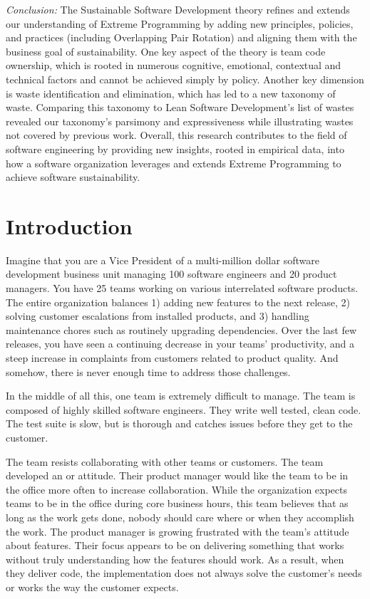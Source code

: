 \textit{Conclusion:} The Sustainable Software Development theory refines and extends our understanding of Extreme Programming by adding new principles, policies, and practices (including Overlapping Pair Rotation) and aligning them with the business goal of sustainability. One key aspect of the theory is team code ownership, which is rooted in numerous cognitive, emotional, contextual and technical factors and cannot be achieved simply by policy. Another key dimension is waste identification and elimination, which has led to a new taxonomy of waste. Comparing this taxonomy to Lean Software Development's list of wastes revealed our taxonomy's parsimony and expressiveness while illustrating wastes not covered by previous work. Overall, this research contributes to the field of software engineering by providing new insights, rooted in empirical data, into how a software organization leverages and extends Extreme Programming to achieve software sustainability.














\chapter{Introduction}
\label{IntroductionChapter}


Imagine that you are a Vice President of a multi-million dollar software development business unit managing 100 software engineers and 20 product managers. You have 25 teams working on various interrelated software products. The entire organization balances 1) adding new features to the next release, 2) solving customer escalations from installed products, and 3) handling maintenance chores such as routinely upgrading dependencies. Over the last few releases, you have seen a continuing decrease in your teams' productivity, and a steep increase in complaints from customers related to product quality. And somehow, there is never enough time to address those challenges.


In the middle of all this, one team is extremely difficult  to manage. The team is composed of highly skilled software engineers. They write well tested, clean code. The test suite is slow, but is thorough and catches issues before they get to the customer. 


The team resists collaborating with other teams or customers. The team developed an  or  attitude. Their product manager would like the team to be in the office more often to increase collaboration. While the organization expects teams to be in the office during core business hours, this team believes that as long as the work gets done, nobody should care where or when they accomplish the work. The product manager is growing frustrated with the team's attitude about features. Their focus appears to be on delivering something that works without truly understanding how the features should work. As a result, when they deliver code, the implementation does not always solve the customer's needs or works the way the customer expects. 


